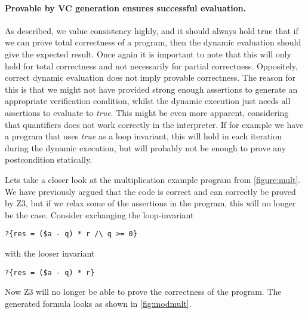 \paragraph{Provable by VC generation ensures successful evaluation.}

As described, we value consistency highly, and it should always hold true that if we can prove total correctness of a program, then the dynamic evaluation should give the expected result. Once again it is important to note that this will only hold for total correctness and not necessarily for partial correctness.
Oppositely, correct dynamic evaluation does not imply provable correctness.
The reason for this is that we might not have provided strong enough assertions to generate an appropriate verification condition, whilst the dynamic execution just needs all assertions to evaluate to \textit{true}. 
This might be even more apparent, considering that quantifiers does not work correctly in the interpreter.
If for example we have a program that uses \textit{true} as a loop invariant, this will hold in each iteration during the dynamic execution, but will probably not be enough to prove any postcondition statically.

Lets take a closer look at the multiplication example program from \cref{figure:mult}. 
% 
We have previously argued that the code is correct and can correctly be proved by Z3, but if we relax some of the assertions in the program, this will no longer be the case.
Consider exchanging the loop-invariant 
\begin{verbatim}
?{res = ($a - q) * r /\ q >= 0}
\end{verbatim}
 with the looser invariant 
\begin{verbatim}
?{res = ($a - q) * r}
\end{verbatim}
Now Z3 will no longer be able to prove the correctness of the program. The generated formula looks as shown in \cref{fig:modmult}.

